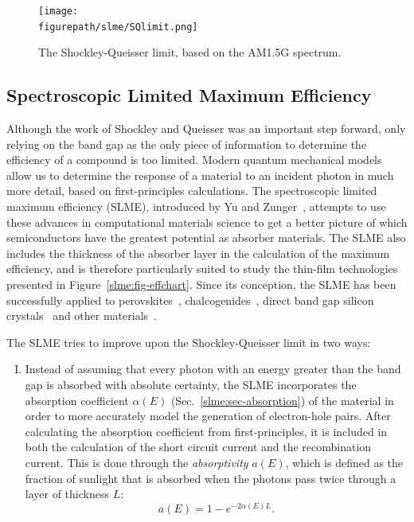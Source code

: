 \begin{refsection}
\begin{figure}[ht]  
\centering 
\texttt{[image: \\figurepath/slme/SQlimit.png]} 
\caption{\label{slme:fig-SQlimit} The Shockley-Queisser limit, based on the 
AM1.5G spectrum.} 
\end{figure} 

 
\subsection{Spectroscopic Limited Maximum Efficiency} \label{slme:sec-SLME} 
 
Although the work of Shockley and Queisser was an important step forward, only 
relying on the band gap as the only piece of information to determine the 
efficiency of a compound is too limited. Modern quantum mechanical models 
allow us to determine the response of a material to an incident photon in much 
more detail, based on first-principles calculations. The 
spectroscopic limited maximum efficiency (SLME), introduced by Yu and 
Zunger~\cite{Yu2012}, attempts to use these advances in computational materials science 
to get a better picture of which semiconductors have the greatest potential as 
absorber materials. The SLME also includes the thickness of the absorber layer 
in the calculation of the maximum efficiency, and is therefore particularly 
suited to study the thin-film technologies presented in 
Figure~\ref{slme:fig-effchart}. Since its conception, the SLME has been 
successfully applied to perovskites~\cite{Yin2014, Yin2015, Yin2015b, 
Meng2016}, chalcogenides~\cite{Hong2016, Sarmadian2016}, direct band gap 
silicon crystals~\cite{Lee2014, Oh2015} and other materials~\cite{Yu2012b, 
Yokoyama2013, Heo2014, Huang2015}.  

\pagebreak[4]
The SLME tries to improve upon the Shockley-Queisser limit in two ways:  
\vspace{0.1in} 
\begin{enumerate}[I.] 
 
\item Instead of assuming that every photon with an energy greater than the 
band gap is absorbed with absolute certainty, the SLME incorporates the 
absorption coefficient $\alpha(E)$ (Sec.~\ref{slme:sec-absorption}) of the 
material in order to more accurately model the generation of electron-hole 
pairs. After calculating the absorption coefficient from first-principles, it is 
included in both the calculation of the short circuit current and the 
recombination current. This is done through the \textit{absorptivity} $a(E)$, 
which is defined as the fraction of sunlight that is absorbed when the photons 
pass twice through a layer of thickness $L$: 
\begin{equation} \label{slme:eq-absorptivity} 
a(E) = 1 - e^{-2 \alpha(E) L}. 
\end{equation} 
 

\end{enumerate}
\end{refsection}
